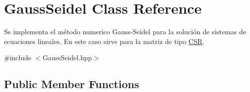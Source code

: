 \hypertarget{class_gauss_seidel}{}\section{Gauss\+Seidel Class Reference}
\label{class_gauss_seidel}


Se implementa el método numerico Gauss-\/\+Seidel para la solución de sistemas de ecuaciones lineales. En este caso sirve para la matriz de tipo \hyperlink{class_c_s_r}{C\+SR}.  




{\ttfamily \#include $<$Gauss\+Seidel.\+hpp$>$}

\subsection*{Public Member Functions}
